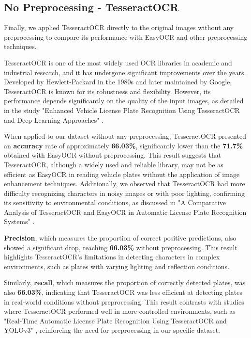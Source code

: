 \documentclass[conference]{IEEEtran}
\begin{document}
    \subsection{No Preprocessing - TesseractOCR}
    
    Finally, we applied TesseractOCR directly to the original images without any preprocessing to compare its performance with EasyOCR and other preprocessing techniques.
    
    TesseractOCR is one of the most widely used OCR libraries in academic and industrial research, and it has undergone significant improvements over the years. Developed by Hewlett-Packard in the 1980s and later maintained by Google, TesseractOCR is known for its robustness and flexibility. However, its performance depends significantly on the quality of the input images, as detailed in the study "Enhanced Vehicle License Plate Recognition Using TesseractOCR and Deep Learning Approaches" \cite{b18}.
    
    When applied to our dataset without any preprocessing, TesseractOCR presented an \textbf{accuracy} rate of approximately \textbf{66.03\%}, significantly lower than the \textbf{71.7\%} obtained with EasyOCR without preprocessing. This result suggests that TesseractOCR, although a widely used and reliable library, may not be as efficient as EasyOCR in reading vehicle plates without the application of image enhancement techniques. Additionally, we observed that TesseractOCR had more difficulty recognizing characters in noisy images or with poor lighting, confirming its sensitivity to environmental conditions, as discussed in "A Comparative Analysis of TesseractOCR and EasyOCR in Automatic License Plate Recognition Systems" \cite{b19}.
    
    \textbf{Precision}, which measures the proportion of correct positive predictions, also showed a significant drop, reaching \textbf{66.03\%} without preprocessing. This result highlights TesseractOCR's limitations in detecting characters in complex environments, such as plates with varying lighting and reflection conditions.
    
    Similarly, \textbf{recall}, which measures the proportion of correctly detected plates, was also \textbf{66.03\%}, indicating that TesseractOCR was less efficient at detecting plates in real-world conditions without preprocessing. This result contrasts with studies where TesseractOCR performed well in more controlled environments, such as "Real-Time Automatic License Plate Recognition Using TesseractOCR and YOLOv3" \cite{b20}, reinforcing the need for preprocessing in our specific dataset.
    
\end{document}
